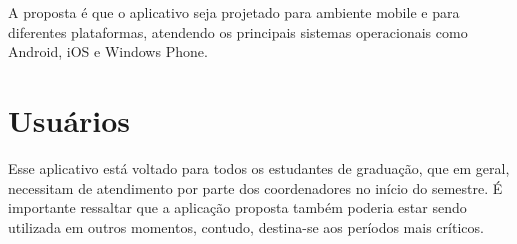 		A proposta é que o aplicativo seja projetado para ambiente mobile e para diferentes plataformas, atendendo os principais sistemas operacionais como Android, iOS e Windows Phone.

	\section[Usuários]{Usuários}
	\label{sec:introducao_usuarios}

		Esse aplicativo está voltado para todos os estudantes de graduação, que em geral, necessitam de atendimento por parte dos coordenadores no início do semestre.
		É importante ressaltar que a aplicação proposta também poderia estar sendo utilizada em outros momentos, contudo, destina-se aos períodos mais críticos.

	


